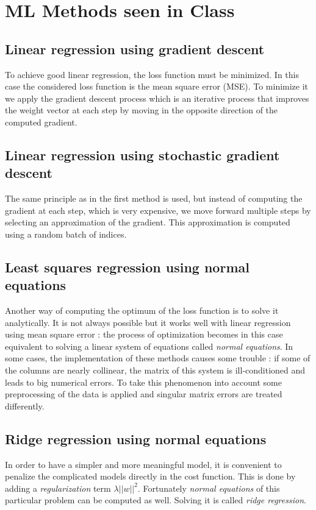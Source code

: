 \documentclass[10pt,conference,compsocconf]{IEEEtran}
\begin{document}
\section{ML Methods seen in Class}

\subsection{Linear regression using gradient descent}
To achieve good linear regression, the loss function must be minimized. In this case the considered loss function is the mean square error (MSE). To minimize it we apply the gradient descent process which is an iterative process that improves the weight vector at each step by moving in the opposite direction of the computed gradient. 

\subsection{Linear regression using stochastic gradient descent}
The same principle as in the first method is used, but instead of computing the gradient at each step, which is very expensive, we move forward multiple steps by selecting an approximation of the gradient. This approximation is computed using a random batch of indices.

\subsection{Least squares regression using normal equations}
Another way of computing the optimum of the loss function is to solve it analytically. It is not always possible but it works well with linear regression using mean square error : the process of optimization becomes in this case equivalent to solving a linear system of equations called \textit{normal equations}. In some cases, the implementation of these methods causes some trouble : if some of the columns are nearly collinear, the matrix of this system is ill-conditioned and leads to big numerical errors. To take this phenomenon into account some preprocessing of the data is applied and singular matrix errors are treated differently.

\subsection{Ridge regression using normal equations}
In order to have a simpler and more meaningful model, it is convenient to penalize the complicated models directly in the cost function. This is done by adding a \textit{regularization} term $\lambda \vert\vert w \vert\vert ^2$. Fortunately \textit{normal equations} of this particular problem can be computed as well. Solving it is called \textit{ridge regression}.
\end{document}
